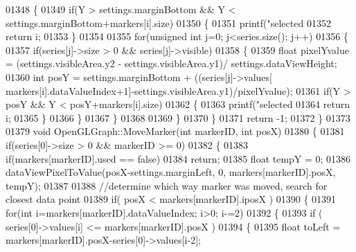 \begin{DoxyCode}
{{{{{{{{{{{{{{01348         \{
01349             \textcolor{keywordflow}{if}(Y > settings.marginBottom && Y < settings.marginBottom+markers[i].size)
01350             \{
01351                 printf(\textcolor{stringliteral}{"selected %
01352                                 \textcolor{keywordflow}{return} i;
01353                         \}
01354 
01355                         \textcolor{keywordflow}{for}(\textcolor{keywordtype}{unsigned} \textcolor{keywordtype}{int} j=0; j<series.size(); j++)
01356                         \{
01357                             \textcolor{keywordflow}{if}(series[j]->size > 0 && series[j]->visible)
01358                             \{
01359                               \textcolor{keywordtype}{float} pixelYvalue = (settings.visibleArea.y2 - 
      settings.visibleArea.y1)/  settings.dataViewHeight;
01360                               \textcolor{keywordtype}{int} posY = settings.marginBottom + ((series[j]->values[
      markers[i].dataValueIndex+1]-settings.visibleArea.y1)/pixelYvalue);
01361                               \textcolor{keywordflow}{if}(Y > posY && Y < posY+markers[i].size)
01362                               \{
01363                                 printf(\textcolor{stringliteral}{"selected %
01364                                 \textcolor{keywordflow}{return} i;
01365                               \}
01366                             \}
01367                         \}
01368 
01369         \}
01370     \}
01371     \textcolor{keywordflow}{return} -1;
01372 \}
01373 
01379 \textcolor{keywordtype}{void} OpenGLGraph::MoveMarker(\textcolor{keywordtype}{int} markerID, \textcolor{keywordtype}{int} posX)
01380 \{
01381     \textcolor{keywordflow}{if}(series[0]->size > 0 && markerID >= 0)
01382     \{
01383         \textcolor{keywordflow}{if}(markers[markerID].used == \textcolor{keyword}{false})
01384             \textcolor{keywordflow}{return};
01385         \textcolor{keywordtype}{float} tempY = 0;
01386         dataViewPixelToValue(posX-settings.marginLeft, 0, markers[markerID].posX, tempY);
01387 
01388         \textcolor{comment}{//determine which way marker was moved, search for closest data point}
01389         \textcolor{keywordflow}{if}( posX < markers[markerID].iposX )
01390         \{
01391             \textcolor{keywordflow}{for}(\textcolor{keywordtype}{int} i=markers[markerID].dataValueIndex; i>0; i-=2)
01392             \{
01393                 \textcolor{keywordflow}{if} ( series[0]->values[i] <= markers[markerID].posX )
01394                 \{
01395                     \textcolor{keywordtype}{float} toLeft = markers[markerID].posX-series[0]->values[i-2];
}}}}}}}}}}}}}}}}
\end{DoxyCode}
